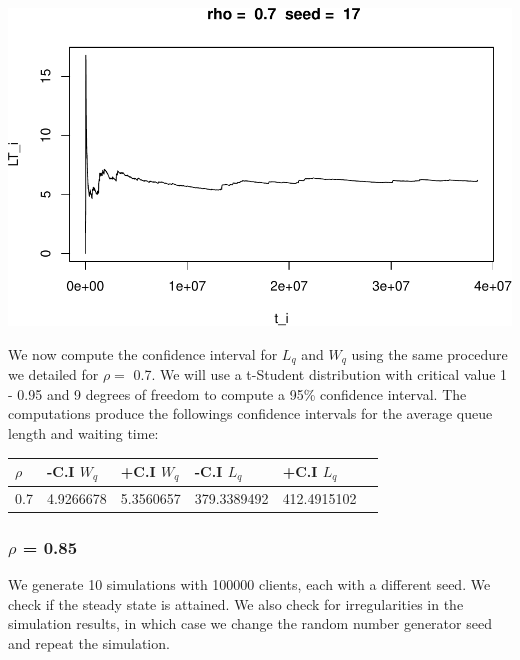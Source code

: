 \documentclass[]{article}
\begin{document}
\includegraphics{003_files/figure-latex/unnamed-chunk-17-10.pdf}

We now compute the confidence interval for \(L_{q}\) and \(W_{q}\) using
the same procedure we detailed for \(\rho =\) 0.7. We will use a
t-Student distribution with critical value 1 - 0.95 and 9 degrees of
freedom to compute a 95\% confidence interval. The computations produce
the followings confidence intervals for the average queue length and
waiting time:

\begin{longtable}[]{@{}llllll@{}}
\toprule
\(\rho\) & -C.I \(W_{q}\) & +C.I \(W_{q}\) & -C.I \(L_{q}\) & +C.I
\(L_{q}\) &\tabularnewline
\midrule
\endhead
0.7 & 4.9266678 & 5.3560657 & 379.3389492 & 412.4915102\tabularnewline
\bottomrule
\end{longtable}

\subsubsection{\texorpdfstring{\(\rho\) =
0.85}{\textbackslash{}rho = 0.85}}\label{rho-0.85}

We generate 10 simulations with 100000 clients, each with a different
seed. We check if the steady state is attained. We also check for
irregularities in the simulation results, in which case we change the
random number generator seed and repeat the simulation.
\end{document}
